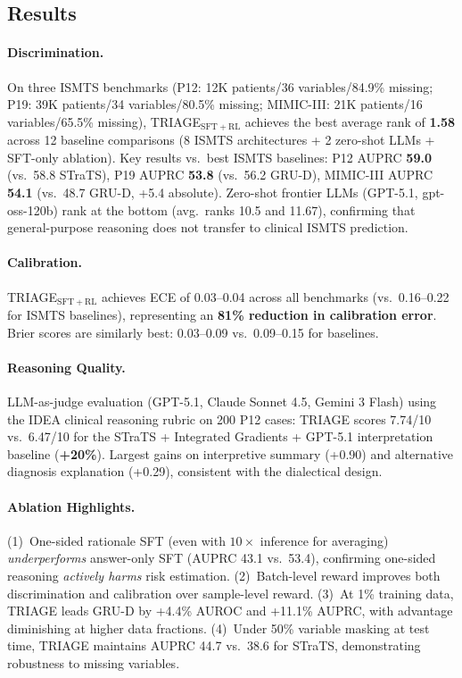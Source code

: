 \documentclass[11pt,a4paper]{article}
\begin{document}
\subsection{Results}

\paragraph{Discrimination.} On three ISMTS benchmarks (P12: 12K patients/36 variables/84.9\% missing; P19: 39K patients/34 variables/80.5\% missing; MIMIC-III: 21K patients/16 variables/65.5\% missing), TRIAGE$_{\mathrm{SFT+RL}}$ achieves the best average rank of \textbf{1.58} across 12 baseline comparisons (8 ISMTS architectures + 2 zero-shot LLMs + SFT-only ablation). Key results vs.\ best ISMTS baselines: P12 AUPRC \textbf{59.0} (vs.\ 58.8 STraTS), P19 AUPRC \textbf{53.8} (vs.\ 56.2 GRU-D), MIMIC-III AUPRC \textbf{54.1} (vs.\ 48.7 GRU-D, +5.4 absolute). Zero-shot frontier LLMs (GPT-5.1, gpt-oss-120b) rank at the bottom (avg.\ ranks 10.5 and 11.67), confirming that general-purpose reasoning does not transfer to clinical ISMTS prediction.

\paragraph{Calibration.} TRIAGE$_{\mathrm{SFT+RL}}$ achieves ECE of 0.03--0.04 across all benchmarks (vs.\ 0.16--0.22 for ISMTS baselines), representing an \textbf{81\% reduction in calibration error}. Brier scores are similarly best: 0.03--0.09 vs.\ 0.09--0.15 for baselines.

\paragraph{Reasoning Quality.} LLM-as-judge evaluation (GPT-5.1, Claude Sonnet 4.5, Gemini 3 Flash) using the IDEA clinical reasoning rubric on 200 P12 cases: TRIAGE scores 7.74/10 vs.\ 6.47/10 for the STraTS + Integrated Gradients + GPT-5.1 interpretation baseline (\textbf{+20\%}). Largest gains on interpretive summary (+0.90) and alternative diagnosis explanation (+0.29), consistent with the dialectical design.

\paragraph{Ablation Highlights.} (1)~One-sided rationale SFT (even with $10\times$ inference for averaging) \emph{underperforms} answer-only SFT (AUPRC 43.1 vs.\ 53.4), confirming one-sided reasoning \emph{actively harms} risk estimation. (2)~Batch-level reward improves both discrimination and calibration over sample-level reward. (3)~At 1\% training data, TRIAGE leads GRU-D by +4.4\% AUROC and +11.1\% AUPRC, with advantage diminishing at higher data fractions. (4)~Under 50\% variable masking at test time, TRIAGE maintains AUPRC 44.7 vs.\ 38.6 for STraTS, demonstrating robustness to missing variables.
\end{document}
